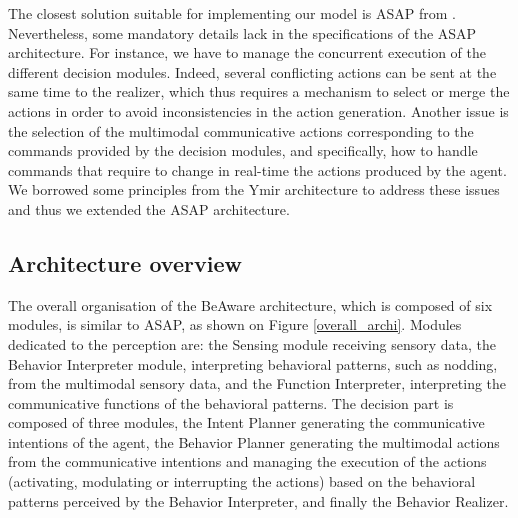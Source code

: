 
The closest solution suitable for implementing our model is ASAP from \cite{kopp_architecture_2014}.
Nevertheless, some mandatory details lack in the specifications of the ASAP architecture. For instance, we have to manage the concurrent execution of the different decision modules. Indeed, several conflicting actions can be sent at the same time to the realizer, which thus requires a mechanism to select or merge the actions in order to avoid inconsistencies in the action generation. Another issue is the selection of the multimodal communicative actions corresponding to the commands provided by the decision modules, and specifically, how to handle commands that require to change in real-time the actions produced by the agent. 
We borrowed some principles from the Ymir architecture \cite{thorisson_mind_1999} to address these issues and thus we extended the ASAP architecture.  

\subsection{Architecture overview}

The overall organisation of the BeAware architecture, which is composed of six modules, is similar to ASAP, as shown on Figure \ref{overall_archi}. 
Modules dedicated to the perception are: 
the Sensing module receiving sensory data, 
the Behavior Interpreter module, interpreting behavioral patterns, such as nodding, from the multimodal sensory data, 
and the Function Interpreter, interpreting the communicative functions of the behavioral patterns. 
The decision part is composed of three modules, 
the Intent Planner generating the communicative intentions of the agent, 
the Behavior Planner generating the multimodal actions from the communicative intentions and managing the execution of the actions (activating, modulating or interrupting the actions) based on the behavioral patterns perceived by the Behavior Interpreter,
and finally the Behavior Realizer. 

